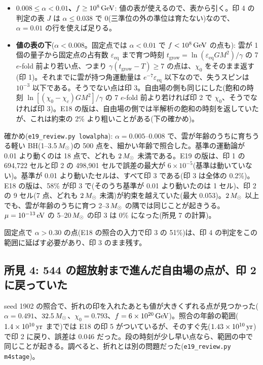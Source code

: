 \begin{itemize}
\item \textbf{$0.008\le\alpha<0.01$、$f\ge10^8\,\mathrm{GeV}$}: 値の表が使えるので、表から引く。印 4 の判定の表 $J$ は $\alpha\le0.038$ で 0(三準位の外の準位は育たない)なので、$\alpha=0.01$ の行を使えば足りる。
\item \textbf{値の表の下}($\alpha<0.008$。固定点では $\alpha<0.01$ で $f<10^8\,\mathrm{GeV}$ の点も): 雲が 1 個の量子から固定点の占有数 $\varepsilon_\mathrm{eq}$ まで育つ時刻 $t_\mathrm{grow}=\ln(\varepsilon_\mathrm{eq}GM^2)/\gamma$ の 7 $e$-fold 前より若い点、つまり $\gamma(t_\mathrm{grow}-T)\ge7$ の点は、$\chi_0$ をそのまま返す(印 1)。それまでに雲が持つ角運動量は $e^{-7}\varepsilon_\mathrm{eq}$ 以下なので、失うスピンは $10^{-3}$ 以下である。そうでない点は印 3。自由場の側も同じにした(飽和の時刻 $\ln[(\chi_0-\chi_c)GM^2]/\gamma$ の 7 $e$-fold 前より若ければ印 2 で $\chi_0$、そうでなければ印 3)。E18 の版は、自由場の側では半解析の飽和の時刻を返していたが、これは約束の 2\% より粗いことがある(下の確かめ)。
\end{itemize}

確かめ(\texttt{e19\_review.py lowalpha}): $\alpha=0.005$--0.008 で、雲が年齢のうちに育ちうる軽い BH(1--3.5$\,M_\odot$)の 500 点を、細かい年齢で照合した。基準の運動論が 0.01 より動くのは 18 点で、どれも $2\,M_\odot$ 未満である。E19 の版は、印 1 の 694{,}722 セルと印 2 の 498{,}901 セルで誤差の最大が $6\times10^{-5}$(基準は動いていない)。基準が 0.01 より動いたセルは、すべて印 3 である(印 3 は全体の 0.2\%)。E18 の版は、58\% が印 3 で(そのうち基準が 0.01 より動いたのは 1 セル)、印 2 の 9 セル(7 点、どれも $2\,M_\odot$ 未満)が約束を越えていた(最大 0.053)。$2\,M_\odot$ 以上でも、雲が年齢のうちに育つ 2--3$\,M_\odot$ の隅では同じことが起きうる。$\mu=10^{-13}\,\mathrm{eV}$ の 5--20$\,M_\odot$ の印 3 は 0\% になった(所見 7 の計算)。

固定点で $\alpha>0.30$ の点(E18 の照合の入力で印 3 の 51\%)は、印 4 の判定をこの範囲に延ばす必要があり、印 3 のまま残す。

\subsection{所見 4: 544 の超放射まで進んだ自由場の点が、印 2 に戻っていた}

seed 1902 の照合で、折れの印を入れたあとも値が大きくずれる点が見つかった($\alpha=0.491$、$32.5\,M_\odot$、$\chi_0=0.793$、$f=6\times10^{20}\,\mathrm{GeV}$)。照合の年齢の範囲($1.4\times10^{10}\,\mathrm{yr}$ まで)では E18 の印 5 がついているが、そのすぐ先($1.43\times10^{10}\,\mathrm{yr}$)で印 2 に戻り、誤差は 0.046 だった。段の時刻が少し早い点なら、範囲の中で同じことが起きる。調べると、折れとは別の問題だった(\texttt{e19\_review.py m4stage})。

